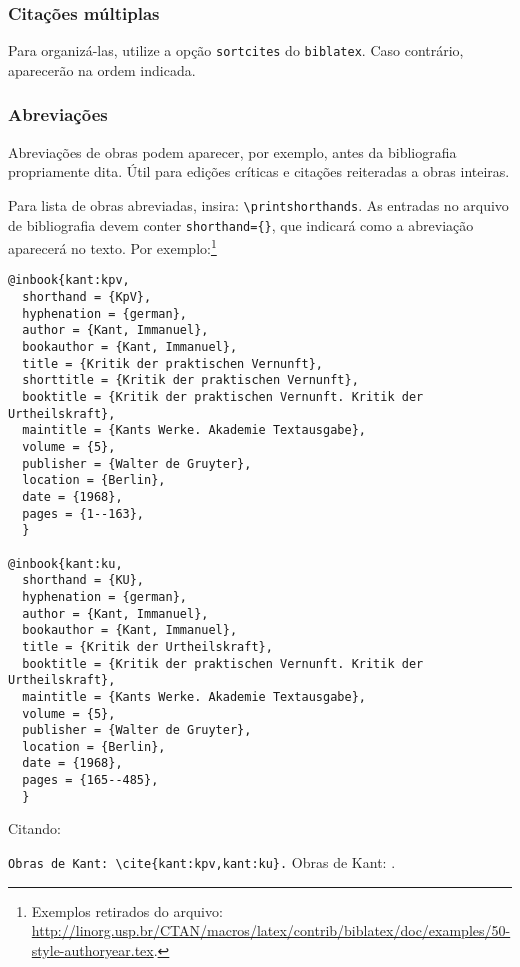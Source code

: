 \subsubsection*{Citações múltiplas}
Para organizá-las, utilize a opção \texttt{sortcites} do \texttt{biblatex}. Caso contrário, aparecerão na ordem indicada.

\subsubsection*{Abreviações}
Abreviações de obras podem aparecer, por exemplo, antes da bibliografia propriamente dita. Útil para edições críticas e citações reiteradas a obras inteiras.

Para lista de obras abreviadas, insira: \verb+\printshorthands+. As entradas no arquivo de bibliografia devem conter \verb+shorthand={}+, que indicará como a abreviação aparecerá no texto. Por exemplo:\footnote{Exemplos retirados do arquivo: \url{http://linorg.usp.br/CTAN/macros/latex/contrib/biblatex/doc/examples/50-style-authoryear.tex}.}

\begin{verbatim}
@inbook{kant:kpv,
  shorthand = {KpV},
  hyphenation = {german},
  author = {Kant, Immanuel},
  bookauthor = {Kant, Immanuel},
  title = {Kritik der praktischen Vernunft},
  shorttitle = {Kritik der praktischen Vernunft},
  booktitle = {Kritik der praktischen Vernunft. Kritik der Urtheilskraft},
  maintitle = {Kants Werke. Akademie Textausgabe},
  volume = {5},
  publisher = {Walter de Gruyter},
  location = {Berlin},
  date = {1968},
  pages = {1--163},
  }

@inbook{kant:ku,
  shorthand = {KU},
  hyphenation = {german},
  author = {Kant, Immanuel},
  bookauthor = {Kant, Immanuel},
  title = {Kritik der Urtheilskraft},
  booktitle = {Kritik der praktischen Vernunft. Kritik der Urtheilskraft},
  maintitle = {Kants Werke. Akademie Textausgabe},
  volume = {5},
  publisher = {Walter de Gruyter},
  location = {Berlin},
  date = {1968},
  pages = {165--485},
  }
\end{verbatim}

Citando:


\begin{center}
\verb+Obras de Kant: \cite{kant:kpv,kant:ku}.+
\qquad
Obras de Kant: \cite{kant:kpv,kant:ku}.
\end{center}

